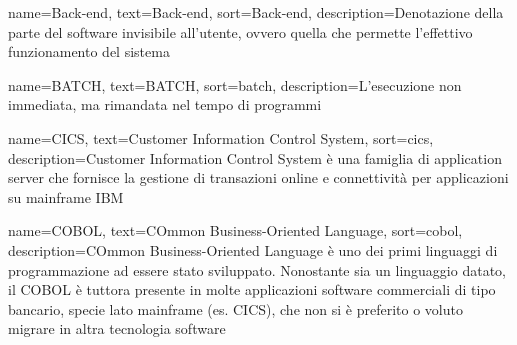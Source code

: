 
%
%



{
    name=Back-end,
    text=Back-end,
    sort=Back-end,
    description={Denotazione della parte del software invisibile all'utente, ovvero quella che permette l'effettivo funzionamento del sistema}
}

{
    name=BATCH,
    text=BATCH,
    sort=batch,
    description={L'esecuzione non immediata, ma rimandata nel tempo di programmi}
}

{
    name=CICS,
    text=Customer Information Control System,
    sort=cics,
    description={Customer Information Control System è una famiglia di application server che fornisce la gestione di transazioni online e connettività per applicazioni su mainframe IBM}
}

{
    name=COBOL,
    text=COmmon Business-Oriented Language,
    sort=cobol,
    description={COmmon Business-Oriented Language è uno dei primi linguaggi di programmazione ad essere stato sviluppato. Nonostante sia un linguaggio datato, il COBOL è tuttora presente in molte applicazioni software commerciali di tipo bancario, specie lato mainframe (es. CICS), che non si è preferito o voluto migrare in altra tecnologia software}
}



